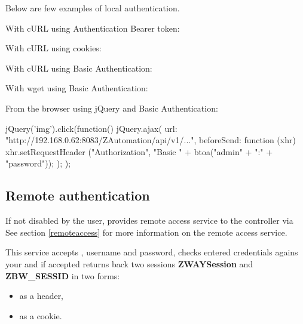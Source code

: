 Below are few examples of local authentication.

With cURL using Authentication Bearer token:
{\scriptsize
\begin{quote} 
\end{quote}
}

With cURL using cookies:
{\scriptsize
\begin{quote} 
\end{quote}
}

With cURL using Basic Authentication:
{\scriptsize
\begin{quote} 
\end{quote}
}

With wget using Basic Authentication:
{\scriptsize
\begin{quote} 
\end{quote}
}

From the browser using jQuery and Basic Authentication:
\begin{listingverbatim}
jQuery('img').click(function() {
    jQuery.ajax({
        url: "http://192.168.0.62:8083/ZAutomation/api/v1/...",
        beforeSend: function (xhr) { xhr.setRequestHeader ("Authorization", "Basic " + btoa("admin" + ":" + "password")); }
    });
});
\end{listingverbatim}

\subsection{Remote authentication}
\label{cap:authentication_remote}

If not disabled by the user, \zway provides remote access service to the controller via 
See section \ref{remoteaccess} for more information on the \zway remote access service.

This service accepts \zwaydeviceid, username and password, checks entered
credentials agains your \zway and if accepted returns back two sessions \textbf{ZWAYSession}
and \textbf{ZBW\_SESSID} in two forms:
\begin{itemize}
\item as a header,
\item as a cookie.
\end{itemize}

